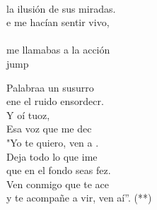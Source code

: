 \begin{cancion}
	\jump\\
la ilusión de sus miradas.\\
	e me hacían sentir vivo, \\
	\jump\\
me llamabas a la acción\\jump\\
	\begin{chorus}%
	 Palabraa un susurro \\
	ene el ruido ensordecr.\\
	Y oí tuoz,\\
	Esa voz que me dec \\
	"Yo te quiero, ven a . \\
	Deja todo lo que ime \\
	que en el fondo seas fez.\\
	Ven conmigo que te ace \\
	y te acompañe a vir, ven aí”. (**)\\
	\end{chorus}%
	\jump\\
\end{cancion}%
